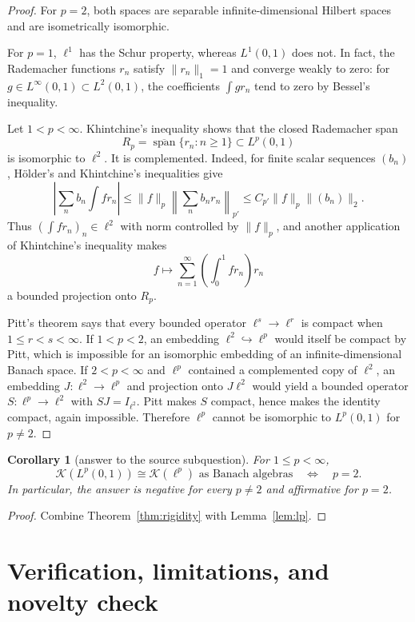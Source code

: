 \documentclass[11pt]{article}
\newtheorem{corollary}[theorem]{Corollary}
\newcommand{\Kop}{\mathcal K}
\begin{document}
\begin{proof}
For $p=2$, both spaces are separable infinite-dimensional Hilbert spaces and
are isometrically isomorphic.

For $p=1$, $\ell^1$ has the Schur property, whereas $L^1(0,1)$ does not.  In
fact, the Rademacher functions $r_n$ satisfy $\|r_n\|_1=1$ and converge weakly
to zero: for $g\in L^\infty(0,1)\subset L^2(0,1)$, the coefficients
$\int g r_n$ tend to zero by Bessel's inequality.

Let $1<p<\infty$.  Khintchine's inequality \cite{Khintchine} shows that the
closed Rademacher span
\[
  R_p=\overline{\operatorname{span}}\{r_n:n\ge1\}\subset L^p(0,1)
\]
is isomorphic to $\ell^2$.  It is complemented.  Indeed, for finite scalar
sequences $(b_n)$, H\"older's and Khintchine's inequalities give
\[
 \left|\sum_n b_n\int f r_n\right|
 \le \|f\|_p\left\|\sum_n b_nr_n\right\|_{p'}
 \le C_{p'}\|f\|_p\|(b_n)\|_2.
\]
Thus $(\int fr_n)_n\in\ell^2$ with norm controlled by $\|f\|_p$, and another
application of Khintchine's inequality makes
\[
  f\longmapsto\sum_{n=1}^\infty\left(\int_0^1 f r_n\right)r_n
\]
a bounded projection onto $R_p$.

Pitt's theorem \cite{Pitt} says that every bounded operator
$\ell^s\to\ell^r$ is compact when $1\le r<s<\infty$.  If $1<p<2$, an
embedding $\ell^2\hookrightarrow\ell^p$ would itself be compact by Pitt, which
is impossible for an isomorphic embedding of an infinite-dimensional Banach
space.  If $2<p<\infty$ and $\ell^p$ contained a complemented copy of
$\ell^2$, an embedding $J:\ell^2\to\ell^p$ and projection onto $J\ell^2$
would yield a bounded operator $S:\ell^p\to\ell^2$ with $SJ=I_{\ell^2}$.
Pitt makes $S$ compact, hence makes the identity compact, again impossible.
Therefore $\ell^p$ cannot be isomorphic to $L^p(0,1)$ for $p\ne2$.
\end{proof}

\begin{corollary}[answer to the source subquestion]\label{cor:answer}
For $1\le p<\infty$,
\[
  \boxed{\quad
  \Kop(L^p(0,1))\cong\Kop(\ell^p)\text{ as Banach algebras}
  \quad\Longleftrightarrow\quad p=2.
  \quad}
\]
In particular, the answer is negative for every $p\ne2$ and affirmative for
$p=2$.
\end{corollary}

\begin{proof}
Combine Theorem~\ref{thm:rigidity} with Lemma~\ref{lem:lp}.
\end{proof}

\section{Verification, limitations, and novelty check}
\end{document}
